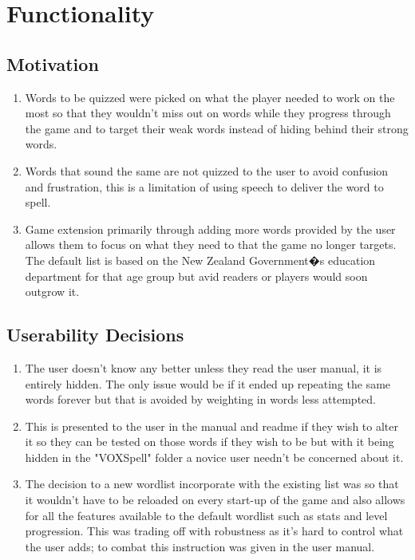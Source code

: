\documentclass[conference]{IEEEtran}
\begin{document}
	\section{Functionality}
	\subsection{Motivation}
	\begin{enumerate}
		\item Words to be quizzed were picked on what the player needed to work on the most so that they wouldn't miss out on words while they progress through the game and to target their weak words instead of hiding behind their strong words.
		\item Words that sound the same are not quizzed to the user to avoid confusion and frustration, this is a limitation of using speech to deliver the word to spell.
		\item Game extension primarily through adding more words provided by the user allows them to focus on what they need to that the game no longer targets. The default list is based on the New Zealand Government�s education department for that age group but avid readers or players would soon outgrow it.
	\end{enumerate}
	\subsection{Userability Decisions}
	\begin{enumerate}
		\item The user doesn't know any better unless they read the user manual, it is entirely hidden. The only issue would be if it ended up repeating the same words forever but that is avoided by weighting in words less attempted.
		\item This is presented to the user in the manual and readme if they wish to alter it so they can be tested on those words if they wish to be but with it being hidden in the "VOXSpell" folder a novice user needn't be concerned about it.
		\item The decision to a new wordlist incorporate with the existing list was so that it wouldn't have to be reloaded on every start-up of the game and also allows for all the features available to the default wordlist such as stats and level progression. This was trading off with robustness as it's hard to control what the user adds; to combat this instruction was given in the user manual.
	\end{enumerate}
	
\end{document}
